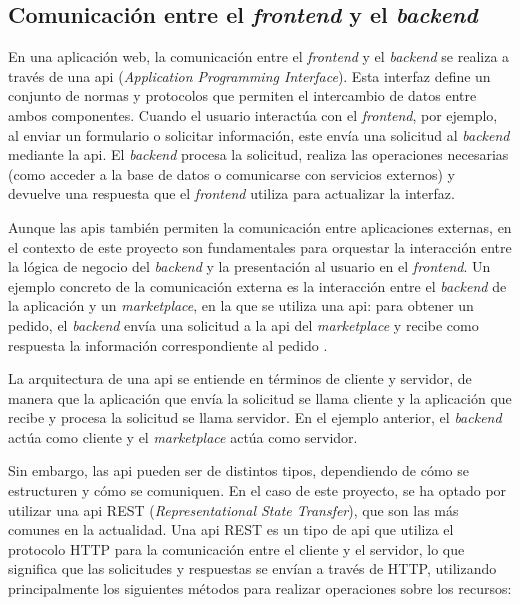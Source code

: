 \subsection{Comunicación entre el \textit{frontend} y el \textit{backend}}
\label{mt:subsec:api}

En una aplicación web, la comunicación entre el \textit{frontend} y el \textit{backend} se realiza a través de una \gls{api} (\textit{Application Programming Interface}). Esta interfaz define un conjunto de normas y protocolos que permiten el intercambio de datos entre ambos componentes. Cuando el usuario interactúa con el \textit{frontend}, por ejemplo, al enviar un formulario o solicitar información, este envía una solicitud al \textit{backend} mediante la \gls{api}. El \textit{backend} procesa la solicitud, realiza las operaciones necesarias (como acceder a la base de datos o comunicarse con servicios externos) y devuelve una respuesta que el \textit{frontend} utiliza para actualizar la interfaz.

Aunque las \gls{api}s también permiten la comunicación entre aplicaciones externas, en el contexto de este proyecto son fundamentales para orquestar la interacción entre la lógica de negocio del \textit{backend} y la presentación al usuario en el \textit{frontend}. Un ejemplo concreto de la comunicación externa es la interacción entre el \textit{backend} de la aplicación y un \textit{marketplace}, en la que se utiliza una \gls{api}: para obtener un pedido, el \textit{backend} envía una solicitud a la \gls{api} del \textit{marketplace} y recibe como respuesta la información correspondiente al pedido \cite{aws_api}.

La arquitectura de una \gls{api} se entiende en términos de cliente y servidor, de manera que la aplicación que envía la solicitud se llama cliente y la aplicación que recibe y procesa la solicitud se llama servidor. En el ejemplo anterior, el \textit{backend} actúa como cliente y el \textit{marketplace} actúa como servidor.

Sin embargo, las \gls{api} pueden ser de distintos tipos, dependiendo de cómo se estructuren y cómo se comuniquen. En el caso de este proyecto, se ha optado por utilizar una \gls{api} REST (\textit{Representational State Transfer}), que son las más comunes en la actualidad. Una \gls{api} REST es un tipo de \gls{api} que utiliza el protocolo HTTP para la comunicación entre el cliente y el servidor, lo que significa que las solicitudes y respuestas se envían a través de HTTP, utilizando principalmente los siguientes métodos para realizar operaciones sobre los recursos:

